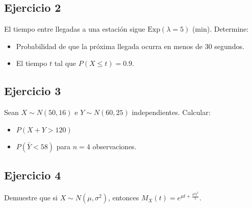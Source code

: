 \documentclass[letterpaper]{article}
\begin{document}
	\subsection{Ejercicio 2}
	El tiempo entre llegadas a una estación sigue $\text{Exp}(\lambda = 5)$ (min). Determine:
	\begin{itemize}
		\item Probabilidad de que la próxima llegada ocurra en menos de 30 segundos.
		\item El tiempo $t$ tal que $P(X \leq t) = 0.9$.
	\end{itemize}
	
	\subsection{Ejercicio 3}
	Sean $X \sim N(50, 16)$ e $Y \sim N(60, 25)$ independientes. Calcular:
	\begin{itemize}
		\item $P(X + Y > 120)$
		\item $P(\bar{Y} < 58)$ para $n = 4$ observaciones.
	\end{itemize}
	
	\subsection{Ejercicio 4}
	Demuestre que si $X \sim N(\mu, \sigma^2)$, entonces $M_X(t) = e^{\mu t + \frac{\sigma^2 t^2}{2}}$.
	
\end{document}
